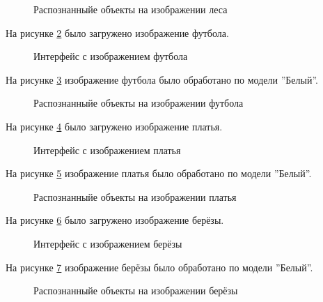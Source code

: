 \begin{figure}[H]
\caption{Распознанныйе объекты на изображении леса}
\label{systemtest_responce10:image}
\end{figure}
На рисунке \ref{systemtest_responce11:image} было загружено изображение футбола.

\begin{figure}[H]
\caption{Интерфейс с изображением футбола}
\label{systemtest_responce11:image}
\end{figure}

На рисунке \ref{systemtest_responce12:image} изображение футбола было обработано по модели ''Белый''.

\begin{figure}[H]
\caption{Распознанныйе объекты на изображении футбола}
\label{systemtest_responce12:image}
\end{figure}
На рисунке \ref{systemtest_responce13:image} было загружено изображение платья.

\begin{figure}[H]
\caption{Интерфейс с изображением платья}
\label{systemtest_responce13:image}
\end{figure}

На рисунке \ref{systemtest_responce14:image} изображение платья было обработано по модели ''Белый''.

\begin{figure}[H]
\caption{Распознанныйе объекты на изображении платья}
\label{systemtest_responce14:image}
\end{figure}

На рисунке \ref{systemtest_responce15:image} было загружено изображение берёзы.

\begin{figure}[H]
\caption{Интерфейс с изображением берёзы}
\label{systemtest_responce15:image}
\end{figure}

На рисунке \ref{systemtest_responce16:image} изображение берёзы было обработано по модели ''Белый''.

\begin{figure}[H]
\caption{Распознанныйе объекты на изображении берёзы}
\label{systemtest_responce16:image}
\end{figure}

